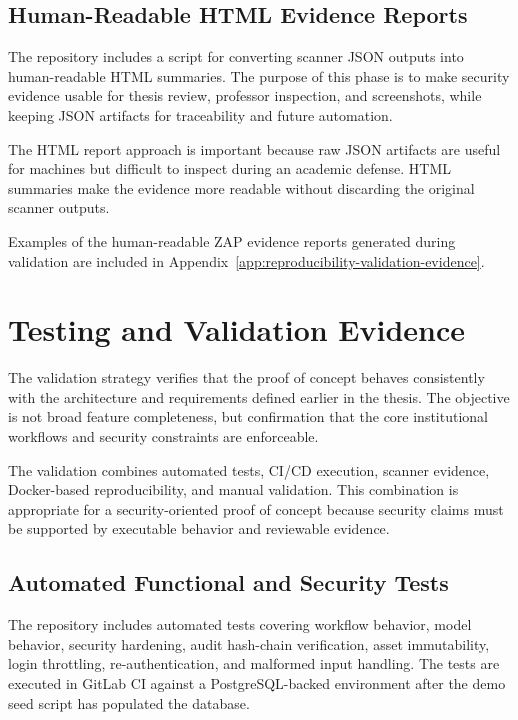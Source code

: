 \documentclass[12pt,a4paper]{report}
\begin{document}
\subsection{Human-Readable HTML Evidence Reports}

The repository includes a script for converting scanner JSON outputs into human-readable HTML summaries. The purpose of this phase is to make security evidence usable for thesis review, professor inspection, and screenshots, while keeping JSON artifacts for traceability and future automation.

The HTML report approach is important because raw JSON artifacts are useful for machines but difficult to inspect during an academic defense. HTML summaries make the evidence more readable without discarding the original scanner outputs.

Examples of the human-readable ZAP evidence reports generated during validation are included in Appendix~\ref{app:reproducibility-validation-evidence}.

\section{Testing and Validation Evidence}

The validation strategy verifies that the proof of concept behaves consistently with the architecture and requirements defined earlier in the thesis. The objective is not broad feature completeness, but confirmation that the core institutional workflows and security constraints are enforceable.

The validation combines automated tests, CI/CD execution, scanner evidence, Docker-based reproducibility, and manual validation. This combination is appropriate for a security-oriented proof of concept because security claims must be supported by executable behavior and reviewable evidence.

\subsection{Automated Functional and Security Tests}

The repository includes automated tests covering workflow behavior, model behavior, security hardening, audit hash-chain verification, asset immutability, login throttling, re-authentication, and malformed input handling. The tests are executed in GitLab CI against a PostgreSQL-backed environment after the demo seed script has populated the database.
\end{document}
